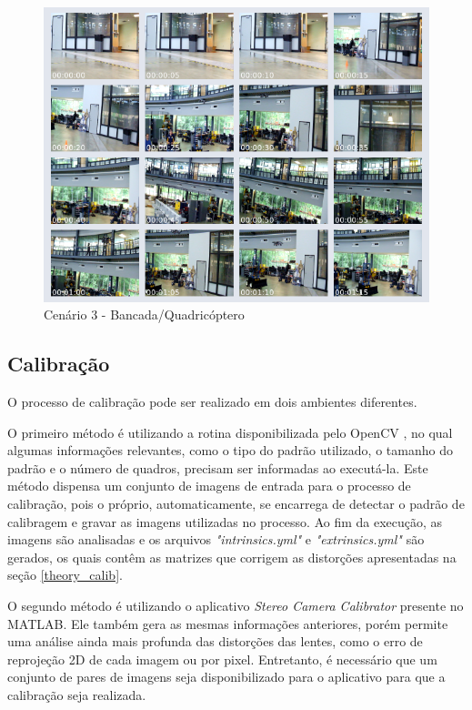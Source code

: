 \begin{figure}[H]
	\centering
	\includegraphics[scale=0.55]{./Resources/thumbs/thumb_video15.png}
	\caption{Cenário 3 - Bancada/Quadricóptero}
	\label{thumb_video15}
\end{figure}


\subsection{Calibração}
O processo de calibração pode ser realizado em dois ambientes diferentes.  

O primeiro método é utilizando a rotina disponibilizada pelo OpenCV \cite{OpenCVCalibrationTutorial}, no qual algumas informações relevantes, como o tipo do padrão utilizado, o tamanho do padrão e o número de quadros, precisam ser informadas ao executá-la. Este método dispensa um conjunto de imagens de entrada para o processo de calibração, pois o próprio, automaticamente, se encarrega de detectar o padrão de calibragem e gravar as imagens utilizadas no processo. Ao fim da execução, as imagens são analisadas e os arquivos \textit{"intrinsics.yml"} e \textit{"extrinsics.yml"} são gerados, os quais contêm as matrizes que corrigem as distorções apresentadas na seção \ref{theory_calib}.

O segundo método é utilizando o aplicativo \textit{Stereo Camera Calibrator} presente no MATLAB. Ele também gera as mesmas informações anteriores, porém permite uma análise ainda mais profunda das distorções das lentes, como o erro de reprojeção 2D de cada imagem ou por pixel. Entretanto, é necessário que um conjunto de pares de imagens seja disponibilizado para o aplicativo para que a calibração seja realizada.

